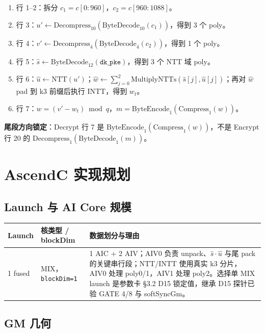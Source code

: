 \documentclass[UTF8,a4paper,11pt]{ctexart}
\begin{document}
\begin{enumerate}
  \item 行 1--2：拆分 \(c_1=c[0:960]\)，\(c_2=c[960:1088]\)。
  \item 行 3：\(u'\leftarrow\mathrm{Decompress}_{10}(\mathrm{ByteDecode}_{10}(c_1))\)，得到 3 个 poly。
  \item 行 4：\(v'\leftarrow\mathrm{Decompress}_{4}(\mathrm{ByteDecode}_{4}(c_2))\)，得到 1 个 poly。
  \item 行 5：\(\hat s\leftarrow\mathrm{ByteDecode}_{12}(\texttt{dk\_pke})\)，得到 3 个 NTT 域 poly。
  \item 行 6：\(\hat u\leftarrow\mathrm{NTT}(u')\)；\(\hat w\leftarrow\sum_{j=0}^{2}\mathrm{MultiplyNTTs}(\hat s[j],\hat u[j])\)；再对 \(\hat w\) pad 到 k3 前缀后执行 INTT，得到 \(w_t\)。
  \item 行 7：\(w=(v'-w_t)\bmod q\)，\(m=\mathrm{ByteEncode}_{1}(\mathrm{Compress}_{1}(w))\)。
\end{enumerate}

\textbf{尾段方向锁定}：Decrypt 行 7 是 \(\mathrm{ByteEncode}_{1}(\mathrm{Compress}_{1}(w))\)，不是 Encrypt 行 20 的 \(\mathrm{Decompress}_{1}(\mathrm{ByteDecode}_{1}(m))\)。

\section{AscendC 实现规划}

\subsection{Launch 与 AI Core 规模}

\begin{longtable}{@{}L{2.5cm}L{3.0cm}L{7.6cm}@{}}
\toprule
Launch & 核类型 / blockDim & 数据划分与理由 \\
 fused & MIX，\texttt{blockDim=1} & 1 AIC + 2 AIV；AIV0 负责 unpack、\(\hat s\cdot\hat u\) 与尾 pack 的关键串行段；NTT/INTT 使用真实 k3 分片，AIV0 处理 poly0/1，AIV1 处理 poly2。选择单 MIX launch 是参数卡 §3.2 D15 锁定值，继承 D15 探针已验 GATE 4/8 与 softSyncGm。 \\
\bottomrule
\end{longtable}

\subsection{GM 几何}
\end{document}
